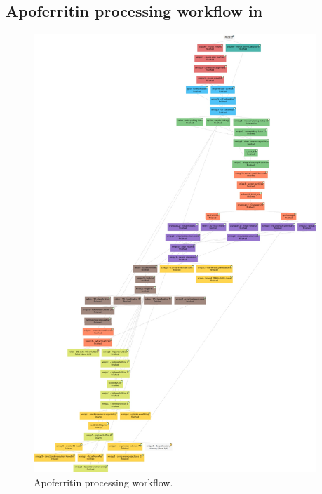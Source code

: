 \subsection*{Apoferritin processing workflow in \scipion}
\begin{figure}[H]
  \centering
  \captionsetup{width=.8\linewidth} 
  \includegraphics[width=0.95\textwidth]
  {images/workflow.pdf}
  \caption{Apoferritin processing workflow.}
  \label{fig:workflow_pdf}
  \end{figure}






